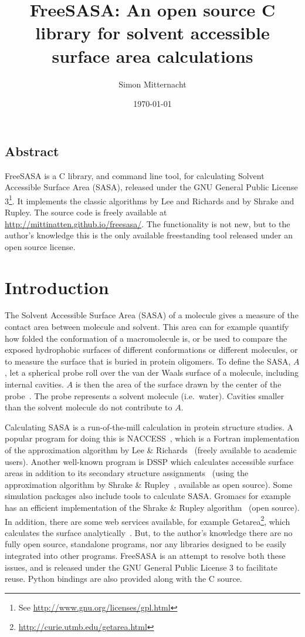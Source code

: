 \documentclass[a4paper,11pt]{article}
\author{Simon Mitternacht}
\date{\today}
\title{FreeSASA: An open source C library for solvent accessible surface
  area calculations
}
\begin{document}
\maketitle

\subsection*{Abstract}
FreeSASA is a C library, and command line tool, for calculating
Solvent Accessible Surface Area (SASA), released under the GNU General
Public License 3\footnote{See
  \url{http://www.gnu.org/licenses/gpl.html}}. It implements the
classic algorithms by Lee and Richards and by Shrake and Rupley. The
source code is freely available at
\url{http://mittinatten.github.io/freesasa/}. The functionality is not
new, but to the author's knowledge this is the only available
freestanding tool released under an open source license.

\section{Introduction}
The Solvent Accessible Surface Area (SASA) of a molecule gives a
measure of the contact area between molecule and solvent. This area
can for example quantify how folded the conformation of a
macromolecule is, or be used to compare the exposed hydrophobic
surfaces of different conformations or different molecules, or to
measure the surface that is buried in protein oligomers. To define the
SASA, $A$, let a spherical probe roll over the van der Waals surface of
a molecule, including internal cavities. $A$ is then the area of the
surface drawn by the center of the probe~\cite{LnR}. The probe
represents a solvent molecule (i.e.\ water). Cavities smaller than the
solvent molecule do not contribute to $A$.

Calculating SASA is a run-of-the-mill calculation in protein structure
studies. A popular program for doing this is NACCESS~\cite{NACCESS},
which is a Fortran implementation of the approximation algorithm by
Lee \& Richards~\cite{LnR} (freely available to academic
users). Another well-known program is DSSP which calculates accessible
surface areas in addition to its secondary structure
assignments~\cite{DSSP} (using the approximation algorithm by Shrake
\& Rupley~\cite{SnR}, available as open source). Some simulation
packages also include tools to calculate SASA. Gromacs for example has
an efficient implementation of the Shrake \& Rupley
algorithm~\cite{DCLM} (open source). In addition, there are some web
services available, for example
Getarea\footnote{\url{http://curie.utmb.edu/getarea.html}}, which
calculates the surface analytically~\cite{Getarea}. But, to the
author's knowledge there are no fully open source, standalone
programs, nor any libraries designed to be easily integrated into
other programs. FreeSASA is an attempt to resolve both these issues,
and is released under the GNU General Public License 3 to facilitate
reuse. Python bindings are also provided along with the C source.
\end{document}
